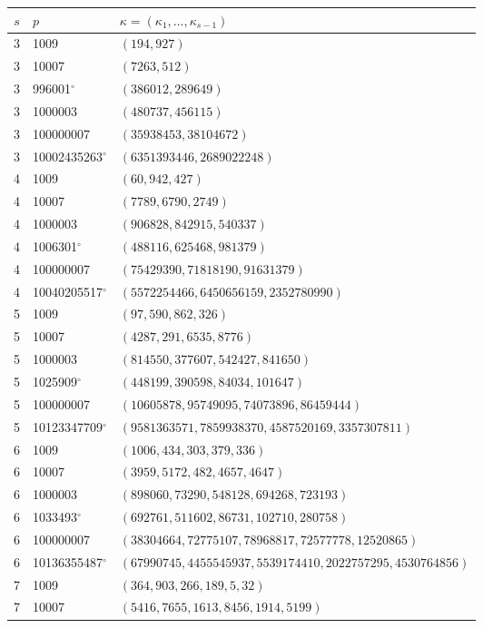 \documentclass[11pt]{amsart}
\theoremstyle{definition}
\theoremstyle{plain}
\begin{document}
\begin{table}[tbp]
\centering\scriptsize\setlength{\tabcolsep}{3pt}
\begin{tabular}{@{}cll@{}}
\toprule
$s$ & $p$ & $\kappa=(\kappa_1,\dots,\kappa_{s-1})$\\
\midrule
3 & 1009 & $(194,927)$\\
3 & 10007 & $(7263,512)$\\
3 & 996001${}^{\circ}$ & $(386012,289649)$\\
3 & 1000003 & $(480737,456115)$\\
3 & 100000007 & $(35938453,38104672)$\\
3 & 10002435263${}^{\circ}$ & $(6351393446,2689022248)$\\
\midrule
4 & 1009 & $(60,942,427)$\\
4 & 10007 & $(7789,6790,2749)$\\
4 & 1000003 & $(906828,842915,540337)$\\
4 & 1006301${}^{\circ}$ & $(488116,625468,981379)$\\
4 & 100000007 & $(75429390,71818190,91631379)$\\
4 & 10040205517${}^{\circ}$ & $(5572254466,6450656159,2352780990)$\\
\midrule
5 & 1009 & $(97,590,862,326)$\\
5 & 10007 & $(4287,291,6535,8776)$\\
5 & 1000003 & $(814550,377607,542427,841650)$\\
5 & 1025909${}^{\circ}$ & $(448199,390598,84034,101647)$\\
5 & 100000007 & $(10605878,95749095,74073896,86459444)$\\
5 & 10123347709${}^{\circ}$ & $(9581363571,7859938370,4587520169,3357307811)$\\
\midrule
6 & 1009 & $(1006,434,303,379,336)$\\
6 & 10007 & $(3959,5172,482,4657,4647)$\\
6 & 1000003 & $(898060,73290,548128,694268,723193)$\\
6 & 1033493${}^{\circ}$ & $(692761,511602,86731,102710,280758)$\\
6 & 100000007 & $(38304664,72775107,78968817,72577778,12520865)$\\
6 & 10136355487${}^{\circ}$ & $(67990745,4455545937,5539174410,2022757295,4530764856)$\\
\midrule
7 & 1009 & $(364,903,266,189,5,32)$\\
7 & 10007 & $(5416,7655,1613,8456,1914,5199)$\\

\end{tabular}
\end{table}
\end{document}
